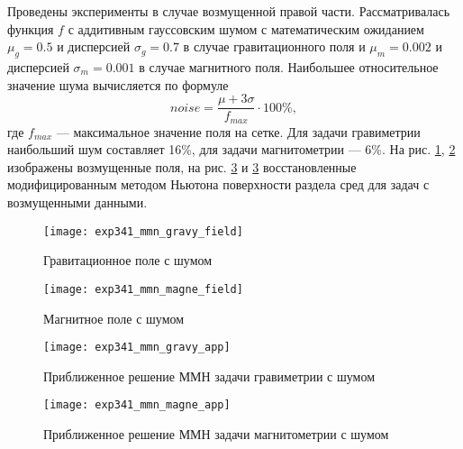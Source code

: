 Проведены эксперименты в случае возмущенной правой части. Рассматривалась функция $f$ с аддитивным гауссовским шумом с математическим ожиданием $\mu_g=0.5$ и дисперсией $\sigma_g=0.7$ в случае гравитационного поля и $\mu_m=0.002$ и дисперсией $\sigma_m=0.001$ в случае магнитного поля. Наибольшее относительное значение шума вычисляется по формуле 
\begin{equation}\label{noise_formula}
	noise=\frac{\mu+3\sigma}{f_{max}}\cdot 100\%,
\end{equation}
где $f_{max}$ --- максимальное значение поля на сетке. Для задачи гравиметрии наибольший шум составляет 16\%, для задачи магнитометрии --- 6\%. На рис. \ref{fig:exp341_mmn_gravy_field}, \ref{fig:exp341_mmn_magne_field} изображены возмущенные поля, на рис. \ref{fig:exp341_mmn_gravy_app} и \ref{fig:exp341_mmn_gravy_app} восстановленные модифицированным методом Ньютона поверхности раздела сред для задач с возмущенными данными.
\begin{figure}[H]
	\centering
	\texttt{[image: exp341\_mmn\_gravy\_field]}
	\caption{Гравитационное поле с шумом}
	\label{fig:exp341_mmn_gravy_field}
\end{figure}
\begin{figure}[H]
	\centering
	\texttt{[image: exp341\_mmn\_magne\_field]}
	\caption{Магнитное поле с шумом}
	\label{fig:exp341_mmn_magne_field}
\end{figure}
\begin{figure}[H]
	\centering
	\texttt{[image: exp341\_mmn\_gravy\_app]}
	\caption{Приближенное решение ММН задачи гравиметрии с шумом}
	\label{fig:exp341_mmn_gravy_app}
\end{figure}
\begin{figure}[H]
	\centering
	\texttt{[image: exp341\_mmn\_magne\_app]}
	\caption{Приближенное решение ММН задачи магнитометрии с шумом}
	\label{fig:exp341_mmn_magne_app}
\end{figure}

